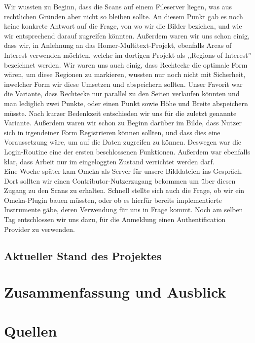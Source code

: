 \documentclass{article}
\begin{document}
Wir wussten zu Beginn, dass die Scans auf einem Fileserver liegen, was aus rechtlichen Gründen aber nicht so bleiben sollte. An diesem Punkt gab es noch keine konkrete Antwort auf die Frage, von wo wir die Bilder beziehen, und wie wir entsprechend darauf zugreifen könnten. Außerdem waren wir uns schon einig, dass wir, in Anlehnung an das Homer-Multitext-Projekt, ebenfalls Areas of Interest verwenden möchten, welche im dortigen Projekt als ,,Regions of Interest'' bezeichnet werden. Wir waren uns auch einig, dass Rechtecke die optimale Form wären, um diese Regionen zu markieren, wussten nur noch nicht mit Sicherheit, inwelcher Form wir diese Umsetzen und abspeichern sollten. Unser Favorit war die Variante, dass Rechtecke nur parallel zu den Seiten verlaufen könnten und man lediglich zwei Punkte, oder einen Punkt sowie Höhe und Breite abspeichern müsste. Nach kurzer Bedenkzeit entschieden wir uns für die zuletzt genannte Variante. Außerdem waren wir schon zu Beginn darüber im Bilde, dass Nutzer sich in irgendeiner Form Registrieren können sollten, und dass dies eine Voraussetzung wäre, um auf die Daten zugreifen zu können. Deswegen war die Login-Routine eine der ersten beschlossenen Funktionen. Außerdem war ebenfalls klar, dass Arbeit nur im eingeloggten Zustand verrichtet werden darf. \\
Eine Woche später kam Omeka als Server für unsere Bilddateien ins Gespräch. Dort sollten wir einen Contributor-Nutzerzugang bekommen um über diesen Zugang zu den Scans zu erhalten. Schnell stellte sich auch die Frage, ob wir ein Omeka-Plugin bauen müssten, oder ob es hierfür bereits implementierte Instrumente gäbe, deren Verwendung für uns in Frage kommt. Noch am selben Tag entschlossen wir uns dazu, für die Anmeldung einen Authentification Provider zu verwenden.


\subsection{Aktueller Stand des Projektes}

\section{Zusammenfassung und Ausblick}

\section*{Quellen}
  \printbibliography[%
    heading=bibintoc, %
  ]
\end{document}
